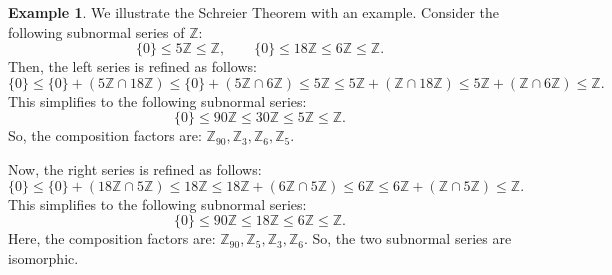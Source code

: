 \documentclass[a4paper, openany]{memoir}
\theoremstyle{definition}
\newtheorem{example}[definition]{Example}
\theoremstyle{plain}
\begin{document}
    \begin{example}
        We illustrate the Schreier Theorem with an example. Consider the following subnormal series of $\mathbb{Z}$:
        \[\{0\} \leq 5\mathbb{Z} \leq \mathbb{Z}, \qquad \{0\} \leq 18\mathbb{Z} \leq 6\mathbb{Z} \leq \mathbb{Z}.\]
        Then, the left series is refined as follows:
        \[\{0\} \leq \{0\} + (5\mathbb{Z} \cap 18\mathbb{Z}) \leq \{0\} + (5\mathbb{Z} \cap 6\mathbb{Z}) \leq 5\mathbb{Z} \leq 5\mathbb{Z} + (\mathbb{Z} \cap 18\mathbb{Z}) \leq 5\mathbb{Z} + (\mathbb{Z} \cap 6\mathbb{Z}) \leq \mathbb{Z}.\]
        This simplifies to the following subnormal series:
        \[\{0\} \leq 90\mathbb{Z} \leq 30\mathbb{Z} \leq 5\mathbb{Z} \leq \mathbb{Z}.\]
        So, the composition factors are: $\mathbb{Z}_{90}, \mathbb{Z}_3, \mathbb{Z}_6, \mathbb{Z}_5$. 
        
        Now, the right series is refined as follows:
        \[\{0\} \leq \{0\} + (18\mathbb{Z} \cap 5\mathbb{Z}) \leq 18\mathbb{Z} \leq 18\mathbb{Z} + (6\mathbb{Z} \cap 5\mathbb{Z}) \leq 6\mathbb{Z} \leq 6\mathbb{Z} + (\mathbb{Z} \cap 5\mathbb{Z}) \leq \mathbb{Z}.\]
        This simplifies to the following subnormal series:
        \[\{0\} \leq 90\mathbb{Z} \leq 18\mathbb{Z} \leq 6\mathbb{Z} \leq \mathbb{Z}.\]
        Here, the composition factors are: $\mathbb{Z}_{90}, \mathbb{Z}_5, \mathbb{Z}_3, \mathbb{Z}_6$. So, the two subnormal series are isomorphic.
    \end{example}
\end{document}
